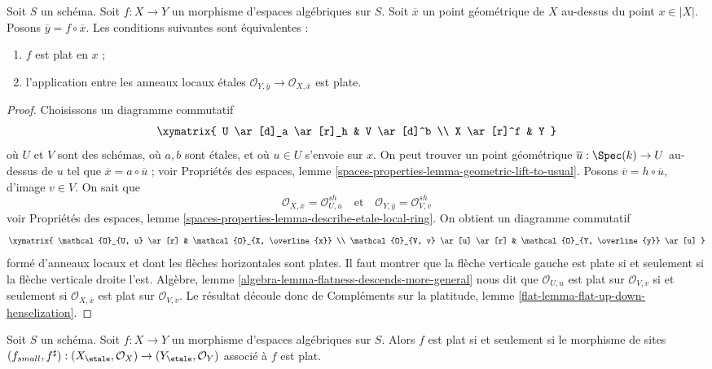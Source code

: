 \begin{lemma}
\label{lemma-flat-at-point-etale-local-rings}
Soit $S$ un schéma.
Soit $f : X \to Y$ un morphisme d'espaces algébriques sur $S$.
Soit $\overline{x}$ un point géométrique de $X$ au-dessus du point
$x \in |X|$. Posons $\overline{y} = f \circ \overline{x}$. Les conditions suivantes
sont équivalentes :
\begin{enumerate}
\item $f$ est plat en $x$ ;
\item l'application entre les anneaux locaux étales
$\mathcal{O}_{Y, \overline{y}} \to \mathcal{O}_{X, \overline{x}}$
est plate.
\end{enumerate}
\end{lemma}

\begin{proof}
Choisissons un diagramme commutatif
$$
\xymatrix{
U \ar[d]_a \ar[r]_h & V \ar[d]^b \\
X \ar[r]^f & Y
}
$$
où $U$ et $V$ sont des schémas, où $a, b$ sont étales, et où
$u \in U$ s'envoie sur $x$. On peut trouver un point géométrique
$\overline{u} : \Spec(k) \to U$ au-dessus de $u$ tel que
$\overline{x} = a \circ \overline{u}$ ; voir
Propriétés des espaces, lemme
\ref{spaces-properties-lemma-geometric-lift-to-usual}.
Posons $\overline{v} = h \circ \overline{u}$, d'image $v \in V$.
On sait que
$$
\mathcal{O}_{X, \overline{x}} = \mathcal{O}_{U, u}^{sh}
\quad\text{et}\quad
\mathcal{O}_{Y, \overline{y}} = \mathcal{O}_{V, v}^{sh}
$$
voir
Propriétés des espaces, lemme
\ref{spaces-properties-lemma-describe-etale-local-ring}.
On obtient un diagramme commutatif
$$
\xymatrix{
\mathcal{O}_{U, u} \ar[r] &
\mathcal{O}_{X, \overline{x}} \\
\mathcal{O}_{V, v} \ar[u] \ar[r] &
\mathcal{O}_{Y, \overline{y}} \ar[u]
}
$$
formé d'anneaux locaux et dont les flèches horizontales sont plates. Il faut montrer que la
flèche verticale gauche est plate si et seulement si la flèche verticale droite l'est.
Algèbre, lemme \ref{algebra-lemma-flatness-descends-more-general}
nous dit que $\mathcal{O}_{U, u}$ est plat sur $\mathcal{O}_{V, v}$
si et seulement si $\mathcal{O}_{X, \overline{x}}$ est plat sur
$\mathcal{O}_{V, v}$. Le résultat découle donc de
Compléments sur la platitude, lemme \ref{flat-lemma-flat-up-down-henselization}.
\end{proof}

\begin{lemma}
\label{lemma-flat-morphism-sites}
Soit $S$ un schéma.
Soit $f : X \to Y$ un morphisme d'espaces algébriques sur $S$.
Alors $f$ est plat si et seulement si le morphisme de sites
$
(f_{small}, f^\sharp) :
(X_\etale, \mathcal{O}_X)
\to
(Y_\etale, \mathcal{O}_Y)
$
associé à $f$ est plat.
\end{lemma}

